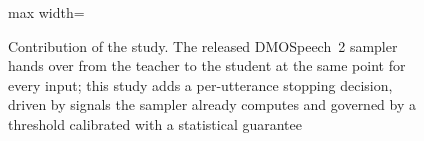 \begin{figure}[!htbp]
\begin{adjustbox}{max width=\linewidth}
\end{adjustbox}
\caption{Contribution of the study. The released DMOSpeech~2 sampler hands over from the teacher to the student at the same point for every input; this study adds a per-utterance stopping decision, driven by signals the sampler already computes and governed by a threshold calibrated with a statistical guarantee}
\label{fig:contribution}
\end{figure}
